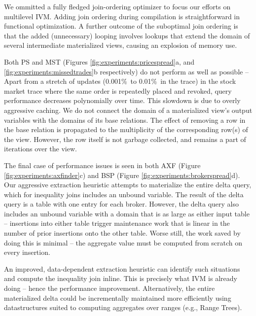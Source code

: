We ommitted a fully fledged join-ordering optimizer to focus our efforts on multilevel IVM. Adding join ordering during compilation is straightforward in functional optimization.
A further outcome of the suboptimal join ordering is that the added (unnecessary) looping involves lookups that extend the domain of several intermediate materialized views, causing an explosion of memory use.

Both PS and MST (Figures \ref{fig:experiments:pricespread}a, and \ref{fig:experiments:missedtrades}b respectively) do not perform as well as possible -- Apart from a stretch of updates (0.001\%\ to 0.01\%\ in the trace) in the stock market trace where the same order is repeatedly placed and revoked, query performance decreases polynomially over time.  This slowdown is due to overly aggressive caching.  We do not connect the domain of a materialized view's output variables with the domains of its base relations.  The effect of removing a row in the base relation is propagated to the multiplicity of the corresponding row(s) of the view.  However, the row itself is not garbage collected, and remains a part of iterations over the view.

The final case of performance issues is seen in both AXF (Figure \ref{fig:experiments:axfinder}c) and BSP (Figure \ref{fig:experiments:brokerspread}d).  Our aggressive extraction heuristic attempts to materialize the entire delta query, which for inequality joins includes an unbound variable.  The result of the delta query is a table with one entry for each broker.  However, the delta query also includes an unbound variable with a domain that is as large as either input table -- insertions into either table trigger maintenance work that is linear in the number of prior insertions onto the other table.  Worse still, the work saved by doing this is minimal -- the aggregate value must be computed from scratch on every insertion.

An improved, data-dependent extraction heuristic can identify such situations and compute the inequality join inline.  This is precisely what IVM is already doing -- hence the performance improvement.  Alternatively, the entire materialized delta could be incrementally maintained more efficiently using datastructures suited to computing aggregates over ranges (e.g., Range Trees\cite{rangequeries}).



